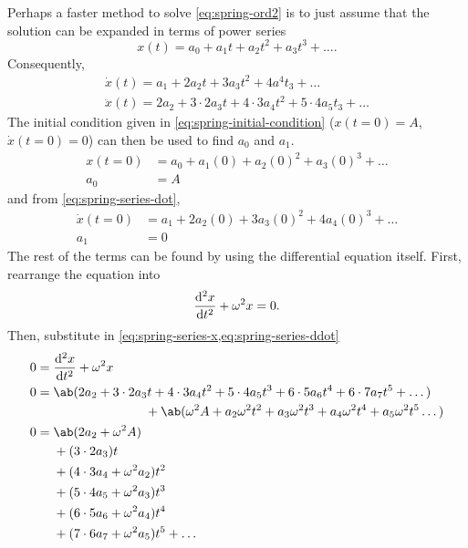 Perhaps a faster method to solve \cref{eq:spring-ord2} is to just assume that the solution can be expanded in terms of power series
\begin{equation}
	x(t) = a_0 + a_1t + a_2t^2 + a_3t^3 + \dots. \label{eq:spring-series-x}
\end{equation}
Consequently,
\begin{gather}
	\dot{x}(t) = a_1 + 2a_2t + 3a_3t^2 + 4a^4t_3 + \dots \label{eq:spring-series-dot} \\
	\ddot{x}(t) = 2a_2 + 3\cdot 2a_3t + 4\cdot 3a_4t^2 + 5\cdot 4a_5t_3 + \dots \label{eq:spring-series-ddot}
\end{gather}
The initial condition given in \cref{eq:spring-initial-condition} ($x(t = 0) = A$, $\dot{x}(t = 0) = 0$) can then be used to find $a_0$ and $a_1$.
\begin{align}
	x(t = 0) &= a_0 + a_1(0) + a_2(0)^2 + a_3(0)^3 + \dots \\
	a_0 &= A
\end{align}
and from \cref{eq:spring-series-dot},
\begin{align}
	\dot{x}(t = 0) &= a_1 + 2a_2(0) + 3a_3(0)^2 + 4a_4(0)^3 + \dots \\
	a_1 &= 0
\end{align}
The rest of the terms can be found by using the differential equation itself. First, rearrange the equation into
\begin{equation}
	\odv[ord = 2]{x}{t} + \omega^2x = 0.
\end{equation}
Then, substitute in \cref{eq:spring-series-x,eq:spring-series-ddot}
\begin{align}
	0 &= \odv[ord = 2]{x}{t} + \omega^2x\\
	0 &= \begin{multlined}[t]
		\ab(2a_2 + 3\cdot 2a_3t + 4\cdot 3a_4t^2 + 5\cdot 4a_5t^3 + 6\cdot 5a_6t^4 + 6\cdot 7a_7t^5 + \dots) \\ + \ab(\omega^2A + a_2\omega^2t^2 + a_3\omega^2t^3 + a_4\omega^2t^4 + a_5\omega^2t^5\dots) \nonumber
	\end{multlined} \\
	0 &= \begin{aligned}[t]
		&\ab(2a_2 + \omega^2A) \\
		& +(3 \cdot 2a_3)t \\
		& +(4\cdot 3a_4 + \omega^2a_2)t^2 \\
		& +(5\cdot 4a_5 + \omega^2a_3)t^3 \\
		& +(6\cdot 5a_6 + \omega^2a_4)t^4 \\
		& +(7\cdot 6a_7 + \omega^2a_5)t^5 + \dots\\
	\end{aligned}
\end{align}
